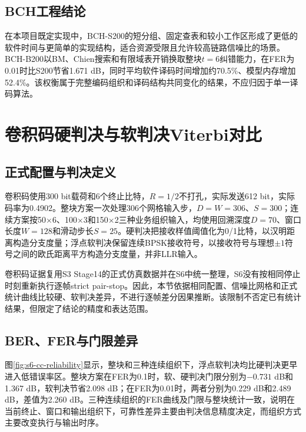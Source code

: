 \subsection{BCH工程结论}

在本项目既定实现中，BCH-S200的短分组、固定查表和较小工作区形成了更低的软件时间与更简单的实现结构，适合资源受限且允许较高链路信噪比的场景。BCH-B200以BM、Chien搜索和有限域表开销换取整块$t=6$纠错能力，在FER为0.01时比S200节省1.671 dB，同时平均软件译码时间增加约70.5\%、模型内存增加52.4\%。该权衡属于完整编码组织和译码结构共同变化的结果，不应归因于单一译码算法。

\section{卷积码硬判决与软判决Viterbi对比}

\subsection{正式配置与判决定义}

卷积码使用300 bit载荷和6个终止比特，$R=1/2$不打孔，实际发送612 bit，实际码率为0.4902。整块方案一次处理306个网格输入步，$D=W=306$、$S=300$；连续方案按50$\times$6、100$\times$3和150$\times$2三种业务组织输入，均使用回溯深度$D=70$、窗口长度$W=128$和滑动步长$S=25$。硬判决把接收样值阈值化为0/1比特，以汉明距离构造分支度量；浮点软判决保留连续BPSK接收符号，以接收符号与理想$\pm1$符号之间的欧氏距离平方构造分支度量，并非LLR输入。

卷积码证据复用S3 Stage14的正式仿真数据并在S6中统一整理，S6没有按相同停止时刻重新执行逐帧strict pair-stop。因此，本节依据相同配置、信噪比网格和正式统计曲线比较硬、软判决差异，不进行逐帧差分因果推断。该限制不否定已有统计结果，但限定了结论的精度和表达范围。

\subsection{BER、FER与门限差异}

图\ref{fig:s6-cc-reliability}显示，整块和三种连续组织下，浮点软判决均比硬判决更早进入低错误率区。整块方案在FER为0.1时，软、硬判决门限分别为$-0.731$ dB和1.367 dB，软判决节省2.098 dB；在FER为0.01时，两者分别为0.229 dB和2.489 dB，差值为2.260 dB。三种连续组织的FER曲线及门限与整块统计一致，说明在当前终止、窗口和输出组织下，可靠性差异主要由判决信息精度决定，而组织方式主要改变执行与输出时序。

